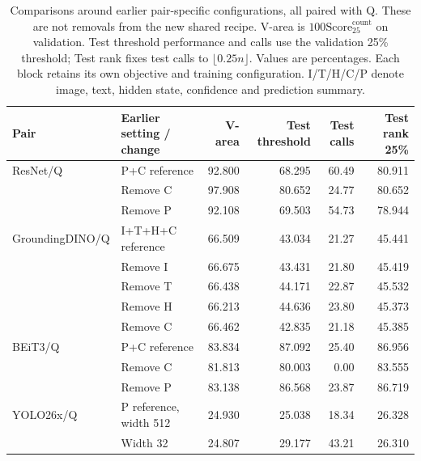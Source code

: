 \begin{table}[H]
\centering
\caption{Comparisons around earlier pair-specific configurations, all paired with Q. These are not removals from the new shared recipe. V-area is $100\mathrm{Score}_{25}^{\mathrm{count}}$ on validation. Test threshold performance and calls use the validation 25\% threshold; Test rank fixes test calls to $\lfloor0.25n\rfloor$. Values are percentages. Each block retains its own objective and training configuration. I/T/H/C/P denote image, text, hidden state, confidence and prediction summary.}
\label{tab:ablation}
\small
\setlength{\tabcolsep}{4.5pt}
\begin{tabular}{@{}llrrrr@{}}
\toprule
Pair & Earlier setting / change & V-area & Test threshold & Test calls & Test rank 25\% \\
\midrule
ResNet/Q & P+C reference & 92.800 & 68.295 & 60.49 & 80.911 \\
 & Remove C & 97.908 & 80.652 & 24.77 & 80.652 \\
 & Remove P & 92.108 & 69.503 & 54.73 & 78.944 \\
\midrule
GroundingDINO/Q & I+T+H+C reference & 66.509 & 43.034 & 21.27 & 45.441 \\
 & Remove I & 66.675 & 43.431 & 21.80 & 45.419 \\
 & Remove T & 66.438 & 44.171 & 22.87 & 45.532 \\
 & Remove H & 66.213 & 44.636 & 23.80 & 45.373 \\
 & Remove C & 66.462 & 42.835 & 21.18 & 45.385 \\
\midrule
BEiT3/Q & P+C reference & 83.834 & 87.092 & 25.40 & 86.956 \\
 & Remove C & 81.813 & 80.003 & 0.00 & 83.555 \\
 & Remove P & 83.138 & 86.568 & 23.87 & 86.719 \\
\midrule
YOLO26x/Q & P reference, width 512 & 24.930 & 25.038 & 18.34 & 26.328 \\
 & Width 32 & 24.807 & 29.177 & 43.21 & 26.310 \\
\bottomrule
\end{tabular}
\end{table}
